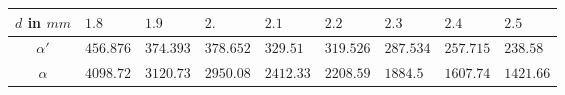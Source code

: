 \begin{tabular}{c|*{8}{*{1}{l}}}
$d$ in $\unit{mm}$ & $1.8$ & $1.9$ & $2.$ & $2.1$ & $2.2$ & $2.3$ & $2.4$ & $2.5$ \\ \hline
$\alpha'$ & $456.876$ & $374.393$ & $378.652$ & $329.51$ & $319.526$ & $287.534$ & $257.715$ & $238.58$ \\ \hline
$\alpha$ & $4098.72$ & $3120.73$ & $2950.08$ & $2412.33$ & $2208.59$ & $1884.5$ & $1607.74$ & $1421.66$\end{tabular}
